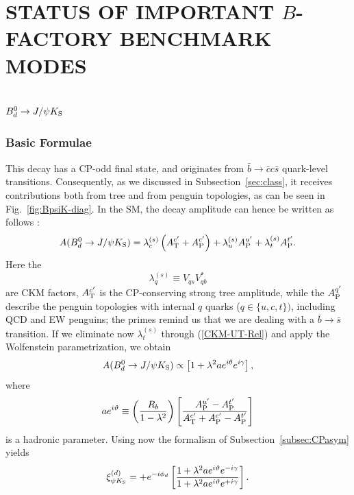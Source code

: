 \documentclass[11pt]{cernrep}
\begin{document}
%
%
%
\section{STATUS OF IMPORTANT \boldmath$B$\unboldmath-FACTORY BENCHMARK 
MODES}\label{sec:bench}
\setcounter{equation}{0}
%
%
%
\boldmath
\subsection{$B^0_d\to J/\psi K_{\rm S}$}\label{ssec:BpsiK}
\unboldmath
%
%
%
\subsubsection{Basic Formulae}
%
%
%
This decay has a CP-odd final state, and originates from 
$\bar b\to\bar c c \bar s$ quark-level transitions. Consequently, as we
discussed in Subsection~\ref{sec:class},
it receives contributions both from tree and from penguin topologies, 
as can be seen in Fig.~\ref{fig:BpsiK-diag}. In the SM, the decay 
amplitude can hence be written as follows \cite{RF-BdsPsiK}:
\begin{equation}\label{Bd-ampl1}
A(B_d^0\to J/\psi K_{\rm S})=\lambda_c^{(s)}\left(A_{\rm T}^{c'}+
A_{\rm P}^{c'}\right)+\lambda_u^{(s)}A_{\rm P}^{u'}
+\lambda_t^{(s)}A_{\rm P}^{t'}.
\end{equation}
Here the
\begin{equation}\label{lamqs-def}
\lambda_q^{(s)}\equiv V_{qs}V_{qb}^\ast
\end{equation}
are CKM factors, $A_{\rm T}^{c'}$ is the CP-conserving strong tree amplitude, 
while the $A_{\rm P}^{q'}$ describe the penguin topologies with internal 
$q$ quarks ($q\in\{u,c,t\})$, including QCD and EW penguins; 
the primes remind us that we are dealing with a $\bar b\to\bar s$ 
transition. If we eliminate now $\lambda_t^{(s)}$ through (\ref{CKM-UT-Rel}) 
and apply the Wolfenstein parametrization, we obtain
\begin{equation}\label{BdpsiK-ampl2}
A(B_d^0\to J/\psi K_{\rm S})\propto\left[1+\lambda^2 a e^{i\theta}
e^{i\gamma}\right],
\end{equation}
where
\begin{equation}
a e^{i\vartheta}\equiv\left(\frac{R_b}{1-\lambda^2}\right)
\left[\frac{A_{\rm P}^{u'}-A_{\rm P}^{t'}}{A_{\rm T}^{c'}+
A_{\rm P}^{c'}-A_{\rm P}^{t'}}\right]
\end{equation}
is a hadronic parameter. Using now the formalism of 
Subsection~\ref{subsec:CPasym} yields
\begin{equation}\label{xi-BdpsiKS}
\xi_{\psi K_{\rm S}}^{(d)}=+e^{-i\phi_d}\left[\frac{1+
\lambda^2a e^{i\vartheta}e^{-i\gamma}}{1+\lambda^2a e^{i\vartheta}
e^{+i\gamma}}\right].
\end{equation}
\end{document}
